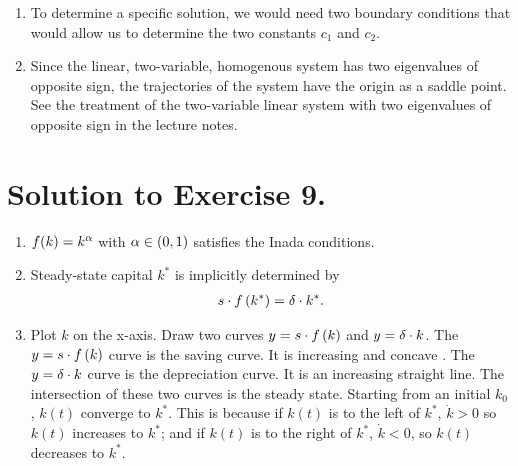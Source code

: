 \documentclass[letterpaper,12pt,leqno]{article}
\begin{document}
\begin{enumerate}
\item To determine a specific solution, we would need two boundary conditions that would allow us to determine the two constants $c_{1}$ and $c_{2}$.
\item Since the linear, two-variable, homogenous system has two eigenvalues of opposite sign, the trajectories of the system have the origin as a saddle point. See the treatment of the two-variable linear system with two eigenvalues of opposite sign in the lecture notes.
\end{enumerate}

\section*{Solution to Exercise 9.}

\begin{enumerate}
\item $f(k)=k^{\alpha}$ with $\alpha\in(0,1)$ satisfies the Inada conditions.
\item Steady-state capital $k^*$ is implicitly determined by
\begin{align*}
s\cdot f\left( k^* \right) =\delta \cdot k^*.
\end{align*}

\item Plot $k$ on the x-axis. Draw two curves $y=s\cdot f\left( k \right) $ and $y=\delta\cdot k$. The $y=s\cdot f\left( k \right)$ curve is the saving curve. It is increasing and concave . The $y=\delta\cdot  k$ curve is the depreciation curve. It is an increasing straight line. The intersection of these two curves is the steady state. Starting
from an initial $k_{0}$, $k(t)$ converge to $k^*$. This is because if $k(t)$ is to the left of $k^*$, $\dot{k}>0$
so $k(t)$ increases to $k^{*}$; and if $k(t)$ is to the right of $k^*$, $\dot{k}<0$, so $k(t)$ decreases to $k^{*}$.
\end{enumerate}
\end{document}
